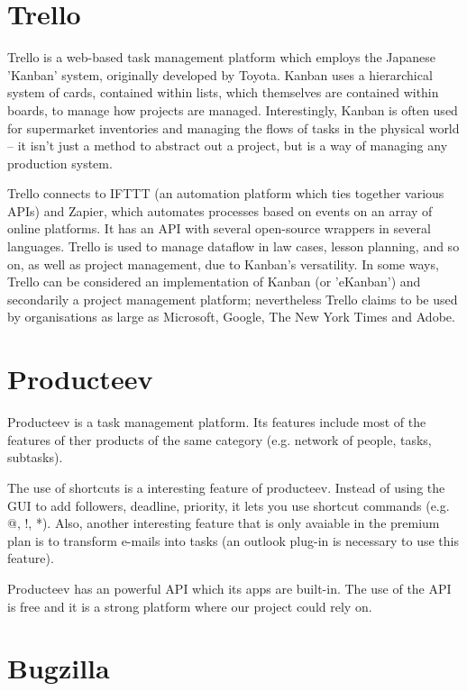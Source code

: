 \documentclass[a4paper]{l3proj}
\begin{document}
\section{Trello}
\label{trello}\par
Trello is a web-based task management platform which employs the Japanese 'Kanban'
system, originally developed by Toyota. Kanban uses a hierarchical system of
cards, contained within lists, which themselves are contained within boards, to
manage how projects are managed. Interestingly, Kanban is often used for
supermarket inventories and managing the flows of tasks in the physical world --
it isn't just a method to abstract out a project, but is a way of managing any
production system.\par
Trello connects to IFTTT (an automation platform which ties together various APIs)
and Zapier, which automates processes based on events on an array of online
platforms. It has an API with several open-source wrappers in several languages.
Trello is used to manage dataflow in law cases, lesson planning, and so on, as
well as project management, due to Kanban's versatility.
In some ways, Trello can be considered an implementation of Kanban (or 'eKanban')
and secondarily a project management platform; nevertheless Trello claims to be
used by organisations as large as Microsoft, Google, The New York Times and
Adobe. 


\section{Producteev}
\label{producteev}

Producteev is a task management platform. Its features include most of the features of ther products of the same
category (e.g. network of people, tasks, subtasks).

The use of shortcuts is a interesting feature of producteev. Instead of using the GUI to add followers, 
deadline, priority, it lets you use shortcut commands (e.g. @, !, *). Also, another interesting feature 
that is only avaiable in the premium plan is to transform e-mails into tasks (an outlook plug-in is necessary
to use this feature).

Producteev has an powerful API which its apps are built-in. The use of the API is free and it is a strong
platform where our project could rely on.


\section{Bugzilla}
\label{Bugzilla}
\end{document}
